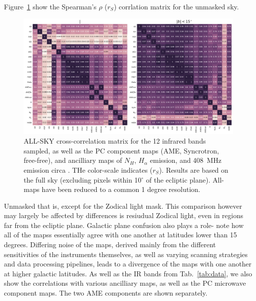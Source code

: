          Figure~\ref{fig:all_bands_corr_matrix_wAME_spearman} show the Spearman's $\rho$ ($r_{S}$) corrlation matrix for the unmasked sky.
          \begin{figure}
            \includegraphics[width=\textwidth]{../Plots/ch_allsky/all_bands_corr_matrix_wAME_spearmanintensity_unmasked.pdf}
            \centering
            \caption{ALL-SKY cross-correlation matrix for the 12 infrared bands sampled, as well as the PC component maps (AME, Syncrotron, free-free), and ancilliary maps of $N_{H}$, $H_{\alpha}$ emission, and 408~MHz emission circa \cite{haslam82}. THe color-scale indicates ($r_{S}$). Results are based on the full sky (excluding pixels within 10$^{\circ}$ of the ecliptic plane). All-maps have been reduced to a common 1 degree resolution.}
            \label{fig:all_bands_corr_matrix_wAME_spearman}
          \end{figure}
        Unmasked that is, except for the Zodical light mask. This comparison however may largely be affected by differences is resiudual Zodical light, even in regions far from the ecliptic plane. Galactic plane confusion also plays a role- note how all of the mapss essentially agree with one another at latitudes lower than 15 degrees. Differing noise of the maps, derived mainly from the different sensitivities of the instruments themselves, as well as varying scanning strategies and data processing pipelines, leads to a divergence of the maps with one another at higher galactic latitudes. As well as the IR bands from Tab.~\ref{tab:data}, we also show the correlations with various ancilliary maps, as well as the PC microwave component maps. The two AME components are shown separately.

